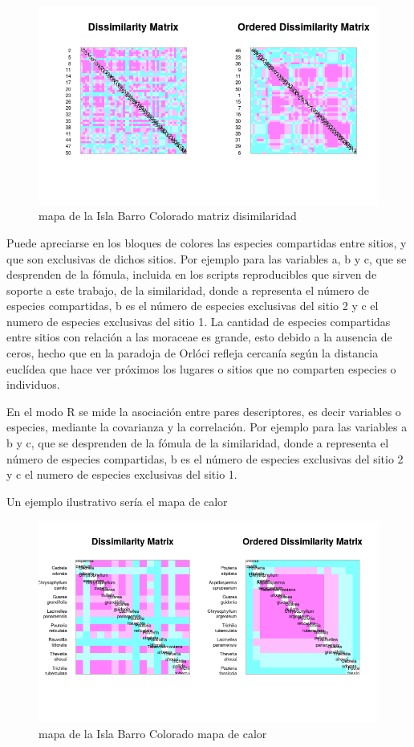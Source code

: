 \documentclass[11pt,]{article}
\begin{document}
\begin{figure}
\centering
\includegraphics[width=1.00000\textwidth]{matriz_similaridad.png}
\caption{mapa de la Isla Barro Colorado matriz disimilaridad
\label{fig:bci_map}}
\end{figure}

Puede apreciarse en los bloques de colores las especies compartidas
entre sitios, y que son exclusivas de dichos sitios. Por ejemplo para
las variables a, b y c, que se desprenden de la fómula, incluida en los
scripts reproducibles que sirven de soporte a este trabajo, de la
similaridad, donde a representa el número de especies compartidas, b es
el número de especies exclusivas del sitio 2 y c el numero de especies
exclusivas del sitio 1. La cantidad de especies compartidas entre sitios
con relación a las moraceae es grande, esto debido a la ausencia de
ceros, hecho que en la paradoja de Orlóci refleja cercanía según la
distancia euclídea que hace ver próximos los lugares o sitios que no
comparten especies o individuos.

En el modo R se mide la asociación entre pares descriptores, es decir
variables o especies, mediante la covarianza y la correlación. Por
ejemplo para las variables a b y c, que se desprenden de la fómula de la
similaridad, donde a representa el número de especies compartidas, b es
el número de especies exclusivas del sitio 2 y c el numero de especies
exclusivas del sitio 1.

Un ejemplo ilustrativo sería el mapa de calor

\begin{figure}
\centering
\includegraphics[width=1.00000\textwidth]{mapadecalor.png}
\caption{mapa de la Isla Barro Colorado mapa de calor
\label{fig:bci_map}}
\end{figure}
\end{document}

